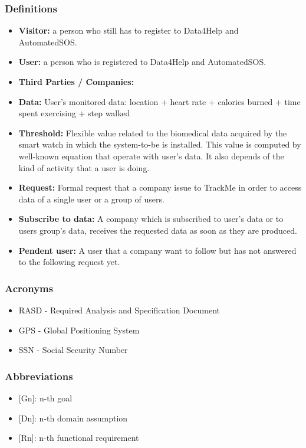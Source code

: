 \documentclass{article}
\begin{document}
\subsubsection{Definitions}
\begin{itemize}
	\item\textbf{Visitor:} a person who still has to register to Data4Help and\\ AutomatedSOS.
	\item\textbf{User:} a person who is registered to Data4Help and AutomatedSOS.
	\item\textbf{Third Parties / Companies:} 
	\item\textbf{Data:} User's monitored data: location + heart rate + calories burned + time spent exercising + step walked 
	\item \textbf{Threshold:} Flexible value related to the biomedical data acquired by the smart watch in which the system-to-be is installed. This value is computed by well-known equation that operate with user's data. It also depends of the kind of activity that a user is doing.  
	\item \textbf{Request:} Formal request that a company issue to TrackMe in order to access data of a single user or a group of users. 
	\item \textbf{Subscribe to data:} A company which is subscribed to user's data or to users group's data, receives the requested data as soon as they are produced.  
	\item \textbf{Pendent user:} A user that a company want to follow but has not answered to the following request yet.
\end{itemize}
\subsubsection{Acronyms}
\begin{itemize}
	\item RASD - Required Analysis and Specification Document
	\item GPS - Global Positioning System
	\item SSN - Social Security Number
\end{itemize}
\subsubsection{Abbreviations}
\begin{itemize}
	\item {[Gn]}: n-th goal
	\item {[Dn]}: n-th domain assumption
	\item {[Rn]}: n-th functional requirement
\end{itemize}
\end{document}
